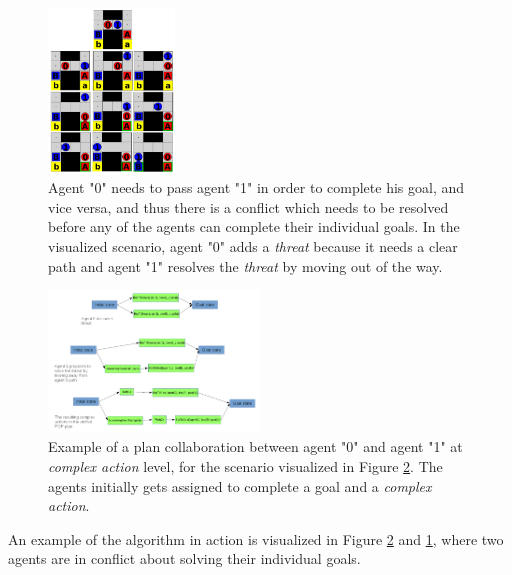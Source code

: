 \documentclass[Main]{subfiles}
\begin{document}
\begin{figure}[h!]
	\centering
	\includegraphics[width=0.3\textwidth]{plan_collab.png}
	\caption{Agent "0" needs to pass agent "1" in order to complete his goal, and vice versa, and thus there is a conflict which needs to be resolved before any of the agents can complete their individual goals. In the visualized scenario, agent "0" adds a \textit{threat} because it needs a clear path and agent "1" resolves the \textit{threat} by moving out of the way.}
	\label{fig:plan_collab}
\end{figure}

\begin{figure}[h!]
	\centering
	\includegraphics[width=0.5\textwidth]{unhtnpop.png}
	\caption{Example of a plan collaboration between agent "0" and agent "1" at \textit{complex action} level, for the scenario visualized in Figure \ref{fig:htn_collab}. The agents initially gets assigned to complete a goal and a \textit{complex action}.}
	\label{fig:htn_collab}
\end{figure}

An example of the algorithm in action is visualized in Figure \ref{fig:htn_collab} and \ref{fig:plan_collab}, where two agents are in conflict about solving their individual goals.
\end{document}
